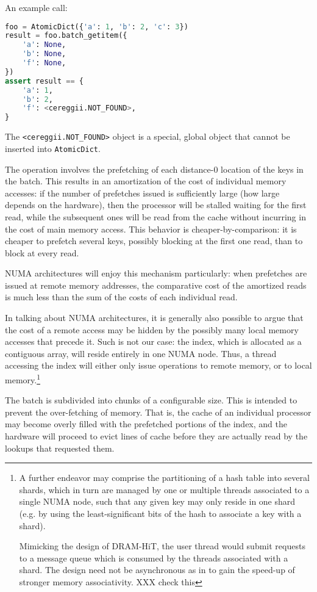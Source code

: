 An example call:

\begin{lstlisting}[language=Python]
foo = AtomicDict({'a': 1, 'b': 2, 'c': 3})
result = foo.batch_getitem({
	'a': None,
	'b': None,
	'f': None,
})
assert result == {
	'a': 1,
	'b': 2,
	'f': <cereggii.NOT_FOUND>,
}
\end{lstlisting}

The \texttt{<cereggii.NOT\_FOUND>} object is a special, global object that cannot be inserted into \texttt{AtomicDict}.

The operation involves the prefetching of each distance-0 location of the keys in the batch.
This results in an amortization of the cost of individual memory accesses: if the number of prefetches issued is sufficiently large (how large depends on the hardware), then the processor will be stalled waiting for the first read, while the subsequent ones will be read from the cache without incurring in the cost of main memory access.
This behavior is cheaper-by-comparison: it is cheaper to prefetch several keys, possibly blocking at the first one read, than to block at every read.

NUMA architectures will enjoy this mechanism particularly: when prefetches are issued at remote memory addresses, the comparative cost of the amortized reads is much less than the sum of the costs of each individual read.

In talking about NUMA architectures, it is generally also possible to argue that the cost of a remote access may be hidden by the possibly many local memory accesses that precede it.
Such is not our case: the index, which is allocated as a contiguous array, will reside entirely in one NUMA node.
Thus, a thread accessing the index will either only issue operations to remote memory, or to local memory.\footnote{%
	A further endeavor may comprise the partitioning of a hash table into several shards, which in turn are managed by one or multiple threads associated to a single NUMA node, such that any given key may only reside in one shard (e.g. by using the least-significant bits of the hash to associate a key with a shard).
	
	Mimicking the design of DRAM-HiT, the user thread would submit requests to a message queue which is consumed by the threads associated with a shard.
	The design need not be asynchronous as in \cite{dramhit} to gain the speed-up of stronger memory associativity. XXX check this
}

The batch is subdivided into chunks of a configurable size.
This is intended to prevent the over-fetching of memory.
That is, the cache of an individual processor may become overly filled with the prefetched portions of the index, and the hardware will proceed to evict lines of cache before they are actually read by the lookups that requested them.


